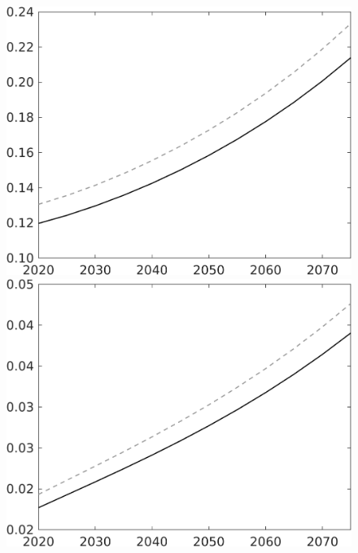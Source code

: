 \documentclass[12pt]{article}
\begin{document}
\begin{figure}[h!!]
\begin{minipage}[]{0.32\textwidth}
	\end{minipage}	
	\begin{minipage}[]{0.32\textwidth}
		\includegraphics[width=1\textwidth]{../../codding_model/own_basedOnFried/optimalPol_010922_revision/figures/all_13Sept22/CompTaul_LFBAU_Reg0_F_spillover0_nsk0_xgr1_knspil0_sep1_countec0_GovRev0_etaa0.79_lgd0.png}
	\end{minipage}	
	\begin{minipage}[]{0.32\textwidth}
		\includegraphics[width=1\textwidth]{../../codding_model/own_basedOnFried/optimalPol_010922_revision/figures/all_13Sept22/CompTaul_LFBAU_Reg0_G_spillover0_nsk0_xgr1_knspil0_sep1_countec0_GovRev0_etaa0.79_lgd0.png}

\end{minipage}
\end{figure}
\end{document}
